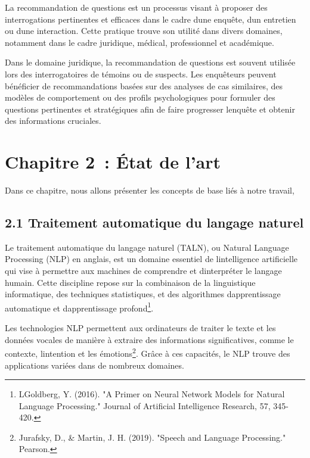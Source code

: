 \documentclass[
]{article}
\begin{document}
La recommandation de questions est un processus visant à proposer des
interrogations pertinentes et efficaces dans le cadre
d\textquotesingle une enquête, d\textquotesingle un entretien ou
d\textquotesingle une interaction. Cette pratique trouve son utilité
dans divers domaines, notamment dans le cadre juridique, médical,
professionnel et académique.

Dans le domaine juridique, la recommandation de questions est souvent
utilisée lors des interrogatoires de témoins ou de suspects. Les
enquêteurs peuvent bénéficier de recommandations basées sur des analyses
de cas similaires, des modèles de comportement ou des profils
psychologiques pour formuler des questions pertinentes et stratégiques
afin de faire progresser l\textquotesingle enquête et obtenir des
informations cruciales.

\section{Chapitre 2~: État de l'art}\label{chapitre-2-uxe9tat-de-lart}

Dans ce chapitre, nous allons présenter les concepts de base liés à
notre travail,

\subsection{2.1 Traitement automatique du langage
naturel}\label{traitement-automatique-du-langage-naturel}

Le traitement automatique du langage naturel (TALN), ou Natural Language
Processing (NLP) en anglais, est un domaine essentiel de
l\textquotesingle intelligence artificielle qui vise à permettre aux
machines de comprendre et d\textquotesingle interpréter le langage
humain. Cette discipline repose sur la combinaison de la linguistique
informatique, des techniques statistiques, et des algorithmes
d\textquotesingle apprentissage automatique et
d\textquotesingle apprentissage profond\footnote{LGoldberg, Y. (2016).
  "A Primer on Neural Network Models for Natural Language Processing."
  Journal of Artificial Intelligence Research, 57, 345-420.}.

Les technologies NLP permettent aux ordinateurs de traiter le texte et
les données vocales de manière à extraire des informations
significatives, comme le contexte, l\textquotesingle intention et les
émotions\footnote{Jurafsky, D., \& Martin, J. H. (2019). "Speech and
  Language Processing." Pearson.}. Grâce à ces capacités, le NLP trouve
des applications variées dans de nombreux domaines.
\end{document}
